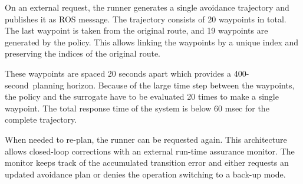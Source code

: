On an external request, the runner generates a single avoidance trajectory and publishes it as ROS message. The trajectory consists of 20 waypoints in total. The last waypoint is taken from the original route, and 19 waypoints are generated by the policy. This allows linking the waypoints by a unique index and preserving the indices of the original route.

These waypoints are spaced 20 seconds apart which provides a 400-second planning horizon. 
Because of the large time step between the waypoints, the policy and the surrogate have to be evaluated 20 times to make a single waypoint. The total response time of the system is below 60 msec for the complete trajectory.

When needed to re-plan, the runner can be requested again. This architecture allows closed-loop corrections with an external run-time assurance monitor. The monitor keeps track of the accumulated transition error and either requests an updated avoidance plan or denies the operation switching to a back-up mode.
